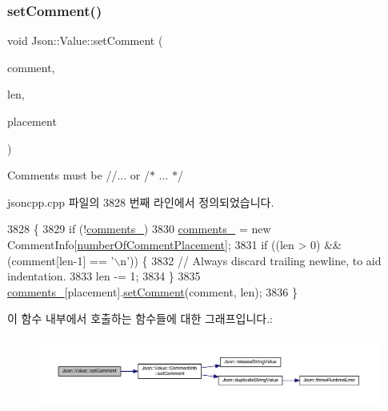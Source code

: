 \subsubsection{\texorpdfstring{set\+Comment()}{setComment()}\hspace{0.1cm}{\footnotesize\ttfamily [2/3]}}
{\footnotesize\ttfamily void Json\+::\+Value\+::set\+Comment (\begin{DoxyParamCaption}\item[{const char $\ast$}]{comment,  }\item[{size\+\_\+t}]{len,  }\item[{\hyperlink{namespace_json_a4fc417c23905b2ae9e2c47d197a45351}{Comment\+Placement}}]{placement }\end{DoxyParamCaption})}



Comments must be //... or /$\ast$ ... $\ast$/ 



jsoncpp.\+cpp 파일의 3828 번째 라인에서 정의되었습니다.


\begin{DoxyCode}
3828                                                                                   \{
3829   \textcolor{keywordflow}{if} (!\hyperlink{class_json_1_1_value_a2016564cabc7a29208e97bd0b782a4e4}{comments\_})
3830     \hyperlink{class_json_1_1_value_a2016564cabc7a29208e97bd0b782a4e4}{comments\_} = \textcolor{keyword}{new} CommentInfo[\hyperlink{namespace_json_a4fc417c23905b2ae9e2c47d197a45351abcbd3eb00417335e094e4a03379659b5}{numberOfCommentPlacement}];
3831   \textcolor{keywordflow}{if} ((len > 0) && (comment[len-1] == \textcolor{charliteral}{'\(\backslash\)n'})) \{
3832     \textcolor{comment}{// Always discard trailing newline, to aid indentation.}
3833     len -= 1;
3834   \}
3835   \hyperlink{class_json_1_1_value_a2016564cabc7a29208e97bd0b782a4e4}{comments\_}[placement].\hyperlink{struct_json_1_1_value_1_1_comment_info_a4d01c2cd8c07995969c5d636dfd4fa8c}{setComment}(comment, len);
3836 \}
\end{DoxyCode}
이 함수 내부에서 호출하는 함수들에 대한 그래프입니다.\+:\nopagebreak
\begin{figure}[H]
\begin{center}
\leavevmode
\includegraphics[width=350pt]{class_json_1_1_value_a2900152a2887b410a9ddabe278b9d492_cgraph}
\end{center}
\end{figure}
\mbox{\label{class_json_1_1_value_a2c5d13a5f45eb77e912008778e65b27f}} 
